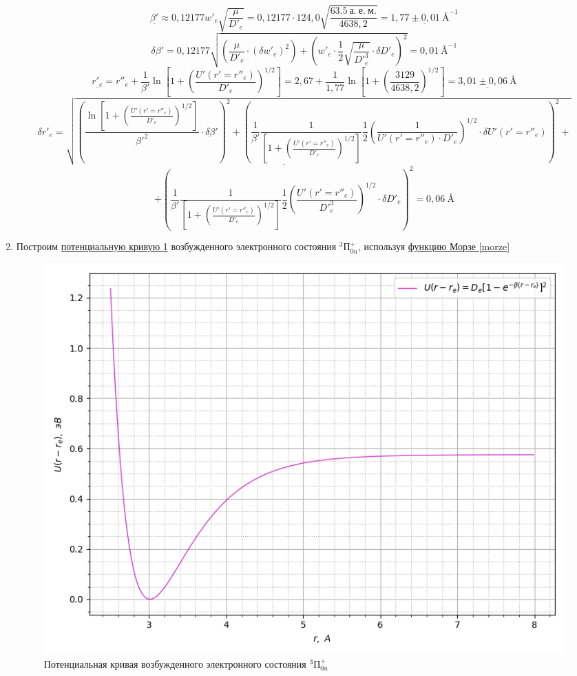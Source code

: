 \documentclass{article}
\begin{document}
\begin{enumerate}
 \begin{equation*}
     \underline{\beta'} \approx 0,12177 w'_e \sqrt{\frac{\mu}{D'_e}} =  0,12177\cdot 124,0 \sqrt{\frac{63.5~а. ~е. ~м.}{4638,2}} = \underline{1,77\pm 0,01~\text{\AA}^{-1}}
 \end{equation*}
 \begin{equation*}
     \delta \beta' = 0,12177\sqrt{\left(\frac{\mu}{D'_e}\cdot (\delta w'_e)^2 \right)+ \left( w'_e \cdot \frac{1}{2}\sqrt{\frac{\mu}{D'_e^3} }\cdot \delta D'_e \right)^2} = 0,01~\text{\AA}^{-1}
 \end{equation*}
 \begin{equation*}
     \underline{r'_e} = r''_e + \frac{1}{\beta'}\ln\left[1+\left(\frac{U'(r' = r''_e)}{D'_e}\right)^{1/2}\right] = 2,67 +  \frac{1}{1,77}\ln\left[1+\left(\frac{3129}{4638,2}\right)^{1/2}\right] = \underline{3,01\pm0,06~\text{\AA} }
 \end{equation*}
 \begin{equation*}
     \delta r'_e = \sqrt{\left(\frac{\ln\left[1+\left(\frac{U'(r' = r''_e)}{D'_e}\right)^{1/2}\right]}{\beta'^2}\cdot \delta \beta'\right) ^2+\left(\frac{1}{\beta'}\frac{1}{\left[1+\left(\frac{U'(r' = r''_e)}{D'_e}\right)^{1/2}\right]}\frac{1}{2} \left(\frac{1}{U'(r' = r''_e)\cdot D'_e}\right)^{1/2} \cdot \delta U'(r' = r''_e)\right)^2 +}
 \end{equation*}
 \begin{equation*}
 \overline{+ \left(\frac{1}{\beta'}\frac{1}{\left[1+\left(\frac{U'(r' = r''_e)}{D'_e}\right)^{1/2}\right]}\frac{1}{2} \left(\frac{U'(r' = r''_e)}{D'_e^3}\right)^{1/2} \cdot \delta D'_e\right)^2} = 0,06~\text{\AA}
 \end{equation*}
 \newpage
 \item Построим \hyperref[fig:morze]{потенциальную кривую  \ref*{fig:morze}} возбужденного электронного состояния $^3П^+_{0u}$, используя \hyperref[morze]{функцию Морзе \ref*{morze}} 
 \begin{figure}[h!]
     \centering
     \includegraphics[scale = 0.8]{morze.png}
     \caption{Потенциальная кривая возбужденного электронного состояния $^3П^+_{0u}$}
     \label{fig:morze}
 \end{figure}
\end{enumerate}
\end{document}
